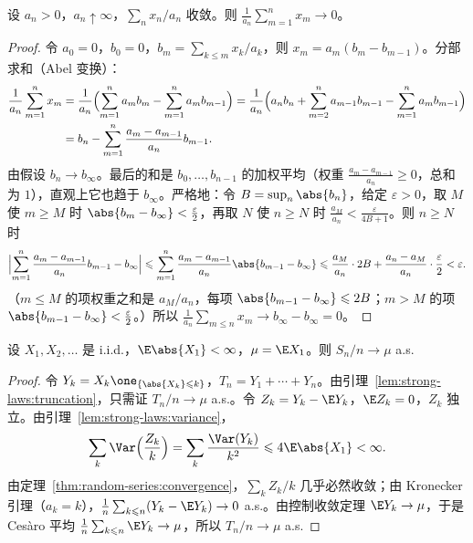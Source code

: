 \begin{theorem}[Kronecker 引理]\label{thm:random-series:kronecker}
设 $a_n>0$，$a_n\uparrow\infty$，$\sum_nx_n/a_n$ 收敛。则 $\frac1{a_n}\sum_{m=1}^nx_m\to0$。
\end{theorem}
\begin{proof}
令 $a_0=0$，$b_0=0$，$b_m=\sum_{k\leqslant m}x_k/a_k$，则 $x_m=a_m(b_m-b_{m-1})$。分部求和（Abel 变换）：
\[
\begin{aligned}
\frac1{a_n}\sum_{m=1}^nx_m&=\frac1{a_n}\Bigl(\sum_{m=1}^na_mb_m-\sum_{m=1}^na_mb_{m-1}\Bigr)=\frac1{a_n}\Bigl(a_nb_n+\sum_{m=2}^na_{m-1}b_{m-1}-\sum_{m=1}^na_mb_{m-1}\Bigr)\\
&=b_n-\sum_{m=1}^n\frac{a_m-a_{m-1}}{a_n}b_{m-1}.
\end{aligned}
\]
由假设 $b_n\to b_\infty$。最后的和是 $b_0,\dots,b_{n-1}$ 的加权平均（权重 $\frac{a_m-a_{m-1}}{a_n}\geqslant0$，总和为 $1$），直观上它也趋于 $b_\infty$。严格地：令 $B=\sup_n\abs{b_n}$，给定 $\varepsilon>0$，取 $M$ 使 $m\geqslant M$ 时 $\abs{b_m-b_\infty}<\frac\varepsilon2$，再取 $N$ 使 $n\geqslant N$ 时 $\frac{a_M}{a_n}<\frac\varepsilon{4B+1}$。则 $n\geqslant N$ 时
\[
\Bigl|\sum_{m=1}^n\frac{a_m-a_{m-1}}{a_n}b_{m-1}-b_\infty\Bigr|\leqslant\sum_{m=1}^n\frac{a_m-a_{m-1}}{a_n}\abs{b_{m-1}-b_\infty}\leqslant\frac{a_M}{a_n}\cdot2B+\frac{a_n-a_M}{a_n}\cdot\frac\varepsilon2<\varepsilon .
\]
（$m\leqslant M$ 的项权重之和是 $a_M/a_n$，每项 $\abs{b_{m-1}-b_\infty}\leqslant2B$；$m>M$ 的项 $\abs{b_{m-1}-b_\infty}<\frac\varepsilon2$。）所以 $\frac1{a_n}\sum_{m\leqslant n}x_m\to b_\infty-b_\infty=0$。
\end{proof}

\begin{theorem}\label{thm:random-series:slln}
设 $X_1,X_2,\dots$ 是 i.i.d.，$\E\abs{X_1}<\infty$，$\mu=\E X_1$。则 $S_n/n\to\mu$ a.s.
\end{theorem}
\begin{proof}
令 $Y_k=X_k\one_{\{\abs{X_k}\leqslant k\}}$，$T_n=Y_1+\cdots+Y_n$。由引理~\ref{lem:strong-laws:truncation}，只需证 $T_n/n\to\mu$ a.s.。令 $Z_k=Y_k-\E Y_k$，$\E Z_k=0$，$Z_k$ 独立。由引理~\ref{lem:strong-laws:variance}，
\[
\sum_k\Var\Bigl(\frac{Z_k}k\Bigr)=\sum_k\frac{\Var(Y_k)}{k^2}\leqslant4\E\abs{X_1}<\infty .
\]
由定理~\ref{thm:random-series:convergence}，$\sum_kZ_k/k$ 几乎必然收敛；由 Kronecker 引理（$a_k=k$），$\frac1n\sum_{k\leqslant n}(Y_k-\E Y_k)\to0$ a.s.。由控制收敛定理 $\E Y_k\to\mu$，于是 Cesàro 平均 $\frac1n\sum_{k\leqslant n}\E Y_k\to\mu$，所以 $T_n/n\to\mu$ a.s.
\end{proof}

